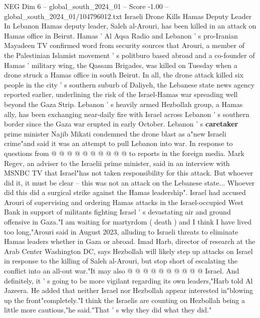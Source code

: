 \begin{textsample}{NEG Dim 6 – global\_south\_2024\_01 – Score -1.00 – global\_south\_2024\_01/104796012.txt}  \label{ex:f6_neg_367}
Israeli Drone Kills Hamas Deputy Leader In Lebanon Hamas deputy leader, Saleh al-Arouri, has been killed in an attack on Hamas office in Beirut.
Hamas ' Al Aqsa Radio and Lebanon ' s pro-Iranian Mayadeen TV confirmed word from security sources that Arouri, a member of the Palestinian Islamist movement ' s politburo based abroad and a co-founder of Hamas ' military wing, the Qassam Brigades, was killed on Tuesday when a drone struck a Hamas office in south Beirut.
In all, the drone attack killed six people in the city ' s southern suburb of Daliyeh, the Lebanese state news agency reported earlier, underlining the risk of the Israel-Hamas war spreading well beyond the Gaza Strip.
Lebanon ' s heavily armed Hezbollah group, a Hamas ally, has been exchanging near-daily fire with Israel across Lebanon ' s southern border since the Gaza war erupted in early October.
Lebanon ' s \textbf{caretaker} prime minister Najib Mikati condemned the drone blast as a"new Israeli crime"and said it was an attempt to pull Lebanon into war.
In response to questions from @ @ @ @ @ @ @ @ @ @ to reports in the foreign media.
Mark Regev, an adviser to the Israelii prime minister, said in an interview with MSNBC TV that Israel"has not taken responsibility for this attack.
But whoever did it, it must be clear -- this was not an attack on the Lebanese state...
Whoever did this did a surgical strike against the Hamas leadership".
Israel had accused Arouri of supervising and ordering Hamas attacks in the Israel-occupied West Bank in support of militants fighting Israel ' s devastating air and ground offensive in Gaza."I am waiting for martyrdom ( death ) and I think I have lived too long,"Arouri said in August 2023, alluding to Israeli threats to eliminate Hamas leaders whether in Gaza or abroad.
Imad Harb, director of research at the Arab Center Washington DC, says Hezbollah will likely step up attacks on Israel in response to the killing of Saleh al-Arouri, but stop short of escalating the conflict into an all-out war."It may also @ @ @ @ @ @ @ @ @ @ Israel.
And definitely, it ' s going to be more vigilant regarding its own leaders,"Harb told Al Jazeera.
He added that neither Israel nor Hezbollah appear interested in"blowing up the front"completely."I think the Israelis are counting on Hezbollah being a little more cautious,"he said."That ' s why they did what they did."

\end{textsample}
